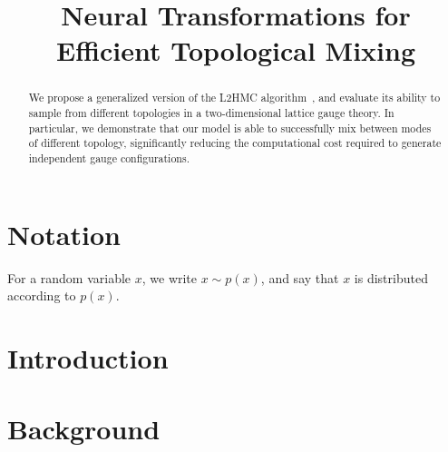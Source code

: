 \documentclass{article} %
\title{Neural Transformations for \\Efficient Topological Mixing}%
\author{Sam Foreman, Xiao-Yong Jin\& James Osborn\thanks{\hyperref{%
      https://github.com/saforem2/l2hmc-qcd
   }{https://github.com/saforem2/l2hmc-qcd} \\
   Leadership Computing Facility\\
   Argonne National Laboratory\\
   Lemont, IL 60439
   \texttt{\{foremans,xjin,\}@anl.gov},%
   \texttt{\{osborn\}@alcf.anl.gov}\\
}}
\begin{document}
\maketitle

\begin{abstract}
   We propose a generalized version of the L2HMC algorithm~\citep{levy2017}, and evaluate its ability to sample from
   different topologies in a two-dimensional lattice gauge theory.
   In particular, we demonstrate that our model is able to successfully mix between modes of different topology,
   significantly reducing the computational cost required to generate independent gauge configurations.
\end{abstract}

\section{\label{sec:notation}Notation}
For a random variable \(x\), we write \(x\sim p(x)\), and say that \(x\) is distributed according to \(p(x)\).

\section{\label{sec:introduction}Introduction}
\color{red}{TODO: Complete introduction}\color{black}
%
\section{\label{sec:background}Background}
\end{document}
